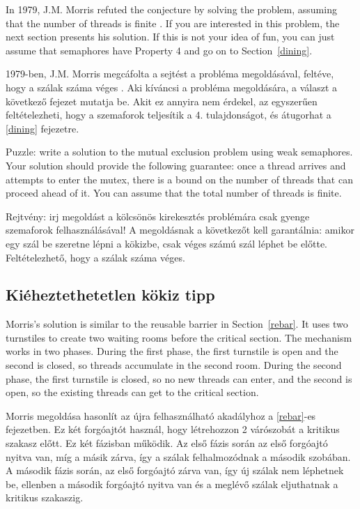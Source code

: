 \documentclass{book}
\newcommand{\clearemptydoublepage}{\newpage\cleardoublepage}
\begin{document}
In 1979, J.M. Morris refuted the conjecture by solving the problem,
assuming that the number of threads is finite \cite{morris}.  If you
are interested in this problem, the next section presents his
solution.  If this is not your idea of fun, you can just assume that
semaphores have Property 4 and go on to Section~\ref{dining}.

1979-ben, J.M. Morris megcáfolta a sejtést a probléma megoldásával,
feltéve, hogy a szálak száma véges \cite{morris}.
Aki kíváncsi a probléma megoldására, a választ a következő fejezet mutatja be.
Akit ez annyira nem érdekel, az egyszerűen feltételezheti, hogy a szemaforok teljesítik
a 4. tulajdonságot, és átugorhat a \ref{dining} fejezetre.

Puzzle: write a solution to the mutual exclusion problem using weak
semaphores.  Your solution should provide the following guarantee:
once a thread arrives and attempts to enter the mutex, there is a
bound on the number of threads that can proceed ahead of it.  You can
assume that the total number of threads is finite.

Rejtvény: irj megoldást a kölcsönös kirekesztés problémára csak
gyenge szemaforok felhasználásával! A megoldásnak a következőt kell
garantálnia: amikor egy szál be szeretne lépni a kökizbe, csak
véges számú szál léphet be előtte. Feltételezhető,
hogy a szálak száma véges.

\clearemptydoublepage
\subsection{Kiéheztethetetlen kökiz tipp}
\label{morris}

Morris's solution is similar to the reusable barrier in
Section~\ref{rebar}.  It uses two turnstiles to create two waiting
rooms before the critical section.  The mechanism works in two phases.
During the first phase, the first turnstile is open and the second is
closed, so threads accumulate in the second room.  During the second
phase, the first turnstile is closed, so no new threads can enter, and
the second is open, so the existing threads can get to the critical
section.

Morris megoldása hasonlít az újra felhasználható akadályhoz a \ref{rebar}-es fejezetben.
Ez két forgóajtót használ, hogy létrehozzon 2 várószobát a kritikus szakasz előtt.
Ez két fázisban működik. Az első fázis során az első forgóajtó nyitva van, míg a másik
zárva, így a szálak felhalmozódnak a második szobában. A második fázis során,
az első forgóajtó zárva van, így új szálak nem léphetnek be, ellenben a második forgóajtó
nyitva van és a meglévő szálak eljuthatnak a kritikus szakaszig.
\end{document}
